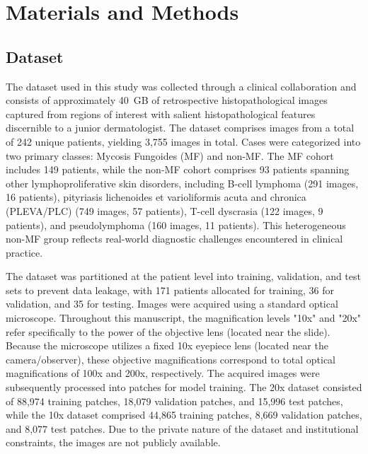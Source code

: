 \documentclass[runningheads]{llncs}
\begin{document}
\section{Materials and Methods}

\subsection{Dataset}
The dataset used in this study was collected through a clinical collaboration and consists of approximately 40~GB of retrospective histopathological images captured from regions of interest with salient histopathological features discernible to a junior dermatologist. The dataset comprises images from a total of 242 unique patients, yielding 3,755 images in total. Cases were categorized into two primary classes: Mycosis Fungoides (MF) and non-MF. The MF cohort includes 149 patients, while the non-MF cohort comprises 93 patients spanning other lymphoproliferative skin disorders, including B-cell lymphoma (291 images, 16 patients), pityriasis lichenoides et varioliformis acuta and chronica (PLEVA/PLC) (749 images, 57 patients), T-cell dyscrasia (122 images, 9 patients), and pseudolymphoma (160 images, 11 patients). This heterogeneous non-MF group reflects real-world diagnostic challenges encountered in clinical practice.

The dataset was partitioned at the patient level into training, validation, and test sets to prevent data leakage, with 171 patients allocated for training, 36 for validation, and 35 for testing. Images were acquired using a standard optical microscope. Throughout this manuscript, the magnification levels "10x" and "20x" refer specifically to the power of the objective lens (located near the slide). Because the microscope utilizes a fixed 10x eyepiece lens (located near the camera/observer), these objective magnifications correspond to total optical magnifications of 100x and 200x, respectively. The acquired images were subsequently processed into patches for model training. The 20x dataset consisted of 88,974 training patches, 18,079 validation patches, and 15,996 test patches, while the 10x dataset comprised 44,865 training patches, 8,669 validation patches, and 8,077 test patches. Due to the private nature of the dataset and institutional constraints, the images are not publicly available.
\end{document}
